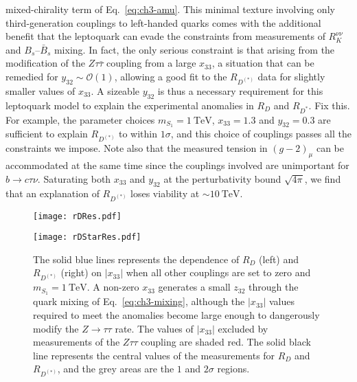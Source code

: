 mixed-chirality term of Eq.~\eqref{eq:ch3-amu}. This minimal texture involving
only third-generation couplings to left-handed quarks comes with the additional
benefit that the leptoquark can evade the constraints from measurements of
$R_K^{\nu\nu}$ and $B_s$--$\bar{B}_s$ mixing. In fact, the only serious
constraint is that arising from the modification of the $Z\tau\bar{\tau}$
coupling from a large $x_{33}$, a situation that can be remedied for
$y_{32} \sim \mathscr{O}(1)$, allowing a good fit to the $R_{D^{(*)}}$ data for
slightly smaller values of $x_{33}$. A sizeable $y_{32}$ is thus a necessary
requirement for this leptoquark model to explain the experimental anomalies in
$R_D$ and $R_{D^*}$. {\color{red}Fix this.} For example, the parameter choices
$m_{S_{1}} = \SI{1}{\TeV}$, $x_{33} = 1.3$ and $y_{32} = 0.3$ are sufficient to
explain $R_{D^{(*)}}$ to within $1\sigma$, and this choice of couplings passes
all the constraints we impose. Note also that the measured tension in
$(g-2)_\mu$ can be accommodated at the same time since the couplings involved
are unimportant for $b \to c \tau \nu$. Saturating both $x_{33}$ and $y_{32}$ at
the perturbativity bound $\sqrt{4\pi}$, we find that an explanation of
$R_{D^{(*)}}$ loses viability at $\sim \SI{10}{\TeV}$.

\begin{figure}[t]
  \centering
  \begin{minipage}[t]{0.45\linewidth}
    \centering \texttt{[image: rDRes.pdf]}
  \end{minipage}
  \hfill
  \begin{minipage}[t]{0.45\linewidth}
    \centering \texttt{[image: rDStarRes.pdf]}
  \end{minipage}
  \caption[The solid blue lines represents the dependence of $R_D$ (left) and
  $R_{D^{(*)}}$ (right) on $|x_{33}|$ when all other couplings are set to zero
  and $m_{S_{1}} = \SI{1}{\TeV}$.]{The solid blue lines represents the dependence
    of $R_D$ (left) and $R_{D^{(*)}}$ (right) on $|x_{33}|$ when all other
    couplings are set to zero and $m_{S_{1}} = \SI{1}{\TeV}$. A non-zero $x_{33}$
    generates a small $z_{32}$ through the quark mixing of
    Eq.~\eqref{eq:ch3-mixing}, although the $|x_{33}|$ values required to meet the
    anomalies become large enough to dangerously modify the $Z \to \tau\tau$
    rate. The values of $|x_{33}|$ excluded by measurements of the $Z\tau\tau$
    coupling are shaded red. The solid black line represents the central values
    of the measurements for $R_D$ and $R_{D^{(*)}}$, and the grey areas are the
    $1$ and $2\sigma$ regions.}
  \label{fig:ch3-rDRes}
\end{figure}

